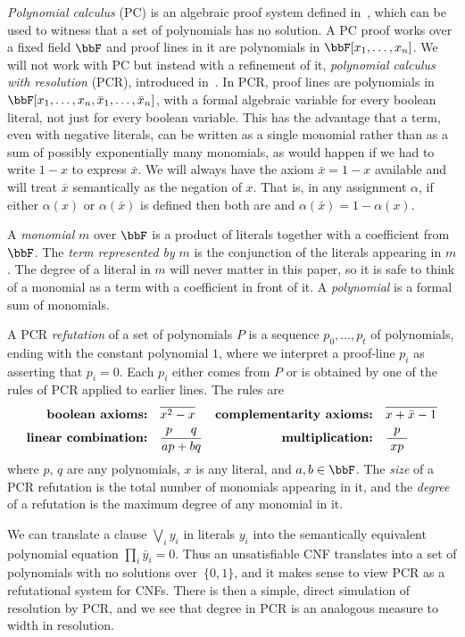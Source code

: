 \documentclass{toc}
\begin{document}
 
\emph{Polynomial calculus} (PC) is an algebraic proof system defined in~\cite{DBLP:conf/stoc/CleggEI96},
which can be used to witness that a set of polynomials has no solution.
A PC proof  works over a fixed field $\bbF$ and proof lines in it are polynomials in $\bbF[x_1,\ldots,x_n]$. 
We will not work with PC but instead with a refinement of it, 
\emph{polynomial calculus with resolution} (PCR), introduced in~\cite{ABRW}.
In PCR, proof lines are polynomials in $\bbF[x_1, \dots, x_n, \bar{x}_1, \dots, \bar{x}_n]$,
with a formal algebraic variable for every boolean literal, not just for every boolean variable.
This has the advantage that a term, even with negative literals, 
can be written as a single monomial rather than as
a sum of possibly exponentially many monomials, as would happen if we had to write  $1-x$
to express $\bar{x}$. We will always have the axiom $\bar{x} = 1-x$ available and will treat 
$\bar{x}$ semantically as the negation of $x$. That is, in any assignment $\alpha$,
 if either $\alpha(x)$ or $\alpha(\bar{x})$ is defined then both 
are and $\alpha(\bar{x}) = 1-\alpha(x)$.

A \emph{monomial} $m$ over $\bbF$ is a product of literals together with a coefficient from $\bbF$.
The \emph{term represented by} $m$ is the conjunction of the literals appearing in $m$.
The degree of a literal in $m$ will never matter in this paper, so it is safe to think of a monomial
as a term with a coefficient in front of it. A \emph{polynomial} is a formal sum of monomials.

A PCR \emph{refutation} of a set of polynomials $P$
is a sequence $p_0, \dots, p_t$ of polynomials, ending with the constant polynomial $1$,
 where we interpret a proof-line $p_i$ as asserting
that $p_i =0$.
Each $p_i$ either comes from $P$ or is obtained by one of the rules
of PCR applied to earlier lines. The rules are
\begin{align*}
\textbf{boolean axioms:} &\quad  \overline{x^2-x}& 
\textbf{complementarity axioms:} & \quad \overline{x+\bar{x}-1^{\vphantom 2}} \\
\textbf{linear combination:} &\quad \frac{p \quad \, \, \, q}{ap+bq}  &
\textbf{multiplication:} &\quad \frac{\;\; p \;\;}{xp}
\end{align*}
where $p$, $q$ are any polynomials, $x$ is any literal, and $a,b\in\bbF$.
The \emph{size} of a PCR refutation is the total number of monomials appearing in it,
and the \emph{degree} of a refutation is the maximum degree of any monomial in it.

We can translate a clause $\bigvee_i y_i$ in literals $y_i$
into the semantically equivalent polynomial equation $\prod_i  \bar{y}_i = 0$.
Thus an unsatisfiable CNF translates into
 a set of polynomials with no solutions 
over~$\{0,1\}$, and it makes sense to view PCR as a refutational system for CNFs.
There is then a simple, direct simulation of resolution by PCR, and we see that
degree in PCR is an analogous measure to width in resolution.
\end{document}
